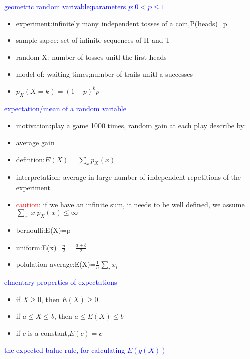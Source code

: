 \textcolor{blue}{geometric random varivable;parameters $p:0<p\leq 1$}

\begin{itemize}
    \item experiment:infinitely many independent tosses of a coin,P(heads)=p
    \item sample sapce: set of infinite sequences of H and T
    \item random X: number of tosses unitl the first heads
    \item model of: waiting times;number of trails unitl a successes
    \item $p_X(X=k)=(1-p)^kp$
\end{itemize}

\textcolor{blue}{expectation/mean of a random variable}

\begin{itemize}
    \item motivation:play a game 1000 times, random gain at each play describe by:
    \item average gain
    \item defintion:$E(X)=\sum_xp_X(x)$
    \item interpretation: average in large number of independent repetitions of the experiment
    \item \textcolor{red}{caution}: if we have an infinite sum, it needs to be well defined, we assume $\sum_x |x|p_X(x)\le \infty$
\end{itemize}


\begin{itemize}
    \item bernoulli:E(X)=p
    \item uniform:E(x)=$\frac{n}{2}=\frac{a+b}{2}$
    \item polulation average:E(X)=$\frac{1}{n}\sum_ix_i$
\end{itemize}

\textcolor{blue}{elmentary properties of expectations}

\begin{itemize}
    \item if $X\geq 0$, then $E(X)\geq 0$
    \item if $a\leq X \leq b$, then $a\leq E(X) \leq b$
    \item if $c$ is a constant,$E(c)=c$
\end{itemize}

\textcolor{blue}{the expected balue rule, for calculating $E(g(X))$}

